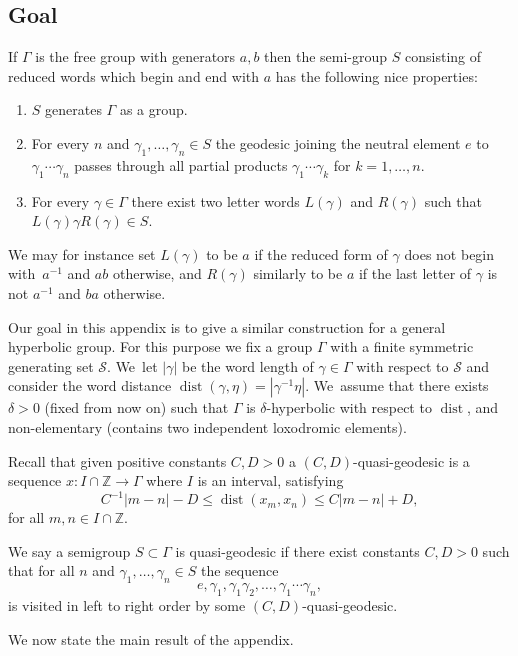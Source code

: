\documentclass[10pt]{amsart}
\newcommand{\Z}{\mathbb{Z}}
\newcommand{\cS}{\mathcal{S}}
\DeclareMathOperator{\dist}{dist}
\begin{document}
\subsection{Goal}

If \(\Gamma\) is the free group with generators \(a,b\) then the semi-group \(S\) consisting of reduced words which begin and end with \(a\) has the following nice properties:
\begin{enumerate}
\item \(S\) generates \(\Gamma\) as a group.
\item For every \(n\) and \(\gamma_1,\ldots, \gamma_n \in S\) the geodesic joining the neutral element \(e\) to \(\gamma_1\cdots \gamma_n\) passes through all partial products \(\gamma_1\cdots \gamma_k\) for \(k = 1,\ldots, n\).
\item For every \(\gamma \in \Gamma\) there exist two letter words \(L(\gamma)\) and \(R(\gamma)\) such that \(L(\gamma)\gamma R(\gamma) \in S\).
\end{enumerate}
We may for instance set \(L(\gamma)\) to be \(a\) if the reduced form of \(\gamma\) does not begin with~\(a^{-1}\) and \(ab\) otherwise, and \(R(\gamma)\) similarly to be \(a\) if the last letter of \(\gamma\) is not \(a^{-1}\) and \(ba\) otherwise.

Our goal in this appendix is to give a similar construction for a general hyperbolic group.
For this purpose we fix a group \(\Gamma\) with a finite symmetric generating set \(\cS\). We~let \(|\gamma|\) be the word length of \(\gamma \in \Gamma\) with respect to \(\cS\) and consider the word distance \(\dist(\gamma,\eta) = |\gamma^{-1}\eta|\). We~assume that there exists \(\delta > 0\) (fixed from now on) such that \(\Gamma\) is \(\delta\)-hyperbolic with respect to \(\dist\), and non-elementary (\ie contains two independent loxodromic elements).

Recall that given positive constants \(C,D > 0\) a \((C,D)\)-quasi-geodesic is a sequence \(x: I \cap \Z \to \Gamma\) where \(I\) is an interval, satisfying
\[
C^{-1}|m-n| - D \le \dist(x_m,x_n) \le C|m-n| + D,
\]
for all \(m,n \in I \cap \Z\).

We say a semigroup \(S \subset \Gamma\) is quasi-geodesic if there exist constants \(C,D > 0\) such that for all \(n\) and \(\gamma_1,\ldots, \gamma_n \in S\) the sequence
\[
e, \gamma_1,\gamma_1\gamma_2,\ldots, \gamma_1\cdots \gamma_n,
\]
is visited in left to right order by some \((C,D)\)-quasi-geodesic.

We now state the main result of the appendix.
\end{document}
